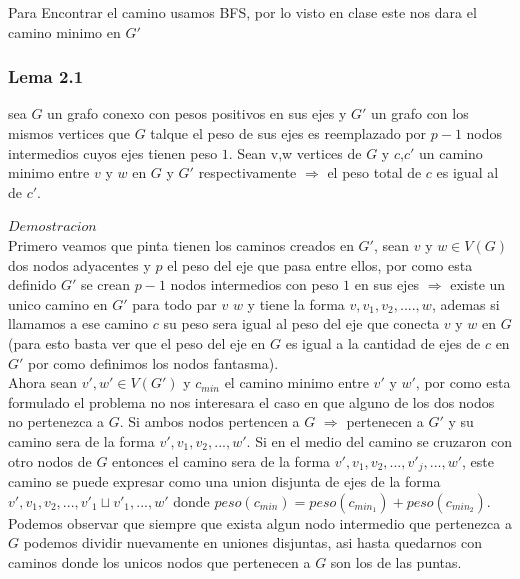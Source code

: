     Para Encontrar el camino usamos BFS, por lo visto en clase este nos dara el camino minimo en $G'$
    \endl

    \subsubsection{Lema 2.1}
        sea $G$ un grafo conexo con pesos positivos en sus ejes y $G'$ un grafo con los mismos vertices que $G$ talque el peso de sus ejes es reemplazado por $p-1$ nodos intermedios cuyos ejes tienen peso $1$. Sean v,w vertices de $G$ y $c$,$c'$ un camino minimo entre $v$ y $w$ en $G$ y $G'$ respectivamente $\Rightarrow$ el peso total de $c$ es igual al de $c'$.
        
        $Demostracion$  \\
        
        Primero veamos que pinta tienen los caminos creados en $G'$, sean $v$ y $w \in V(G)$ dos nodos adyacentes y $p$ el peso del eje que pasa entre ellos, por como esta definido $G'$ se crean $p-1$ nodos intermedios con peso $1$ en sus ejes $\Rightarrow$ existe un unico camino en $G'$ para todo par $v$ $w$ y tiene la forma ${v, v_1, v_2, .... , w}$, ademas si llamamos a ese camino $c$ su peso sera igual al peso del eje que conecta $v$ y $w$ en $G$ (para esto basta ver que el peso del eje en $G$ es igual a la cantidad de ejes de $c$ en $G'$ por como definimos los nodos fantasma). \\
        
        Ahora sean $v',w' \in V(G')$ y $c_{min}$ el camino minimo entre $v'$ y $w'$, por como esta formulado el problema no nos interesara el caso en que alguno de los dos nodos no pertenezca a $G$. Si ambos nodos pertencen a $G$ $\Rightarrow$ pertenecen a $G'$ y su camino sera de la forma ${v', v_1, v_2, ... , w'}$. Si en el medio del camino se cruzaron con otro nodos de $G$ entonces el camino sera de la forma ${v', v_1, v_2, ... , v'_j, ... , w'}$, este camino se puede expresar como una union disjunta de ejes de la forma ${v', v_1, v_2, ..., v'_1} \sqcup {v'_1, ..., w'}$ donde $peso(c_{min}) = peso(c_{min_1}) + peso(c_{min_2})$. Podemos observar que siempre que exista algun nodo intermedio que pertenezca a $G$ podemos dividir nuevamente en uniones disjuntas, asi hasta quedarnos con caminos donde los unicos nodos que pertenecen a $G$ son los de las puntas. \\
        

